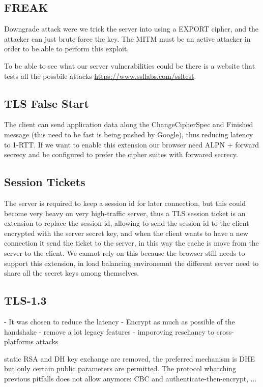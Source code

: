 \documentclass[12pt]{article}
\begin{document}
\subsection{FREAK}
Downgrade attack were we trick the server into using a EXPORT cipher, and the attacker can just brute force the key. The MITM must be an active attacker in order to be able to perform this exploit.

To be able to see what our server vulnerabilities could be there is a website that tests all the possbile attacks \url{https://www.ssllabs.com/ssltest}.

\subsection{TLS False Start}
The client can send application data along the ChangeCipherSpec and Finished message (this need to be fast is being pushed by Google), thus reducing latency to 1-RTT. If we want to enable this extension our browser need ALPN + forward secrecy and be configured to prefer the cipher suites with forwared secrecy.

\subsection{Session Tickets}
The server is required to keep a session id for later connection, but this could become very heavy on very high-traffic server, thus a TLS session ticket is an extension to replace the session id, allowing to send the session id to the client encrypted with the server secret key, and when the client wants to have a new connection it send the ticket to the server, in this way the cache is move from the server to the client. We cannot rely on this because the browser still needs to support this extension, in load balancing environemnt the different server need to share all the secret keys among themselves.



\subsection{TLS-1.3}
- It was chosen to reduce the latency
- Encrypt as much as possible of the handshake
- remove a lot legacy features
- imporoving reseliancy to cross-platforms attacks


static RSA and DH key exchange are removed, the preferred mechanism is DHE but only certain public parameters are permitted. The protocol whatching previous pitfalls does not allow anymore: CBC and authenticate-then-encrypt, ...
\end{document}
